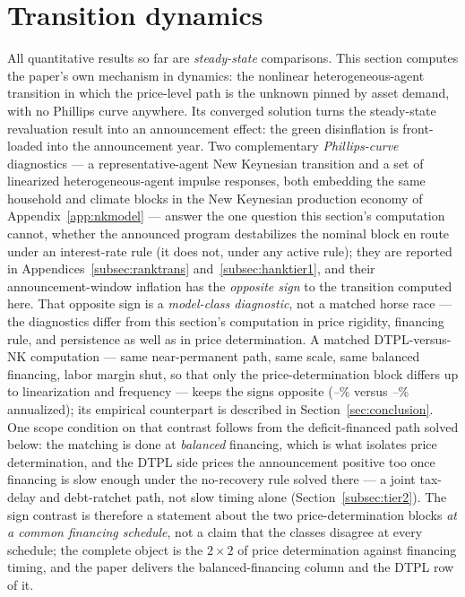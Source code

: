 \documentclass[12pt]{article}
\providecommand{\pendingnum}{\textit{--}}
\providecommand{\matchedNKimpact}{\pendingnum}
\providecommand{\matchedDTPLimpact}{\pendingnum}
\begin{document}
\section{Transition dynamics}\label{sec:transitions}

All quantitative results so far are \emph{steady-state} comparisons. This
section computes the paper's own mechanism in dynamics: the nonlinear
heterogeneous-agent transition in which the price-level path is the
unknown pinned by asset demand, with no Phillips curve anywhere. Its
converged solution turns the steady-state revaluation result into an
announcement effect: the green disinflation is front-loaded into the
announcement year. Two complementary \emph{Phillips-curve} diagnostics ---
a representative-agent New Keynesian transition and a set of linearized
heterogeneous-agent impulse responses, both embedding the same household
and climate blocks in the New Keynesian production economy of
Appendix~\ref{app:nkmodel} --- answer the one question this section's
computation cannot, whether the announced program destabilizes the nominal
block en route under an interest-rate rule (it does not, under any active
rule); they are reported in Appendices~\ref{subsec:ranktrans}
and~\ref{subsec:hanktier1}, and their announcement-window inflation has the
\emph{opposite sign} to the transition computed here. That opposite sign is
a \emph{model-class diagnostic}, not a matched horse race --- the
diagnostics differ from this section's computation in price rigidity,
financing rule, and persistence as well as in price determination. A
matched DTPL-versus-NK computation --- same near-permanent path, same
scale, same balanced financing, labor margin shut, so that only the
price-determination block differs up to linearization and frequency ---
keeps the signs opposite (\matchedNKimpact\% versus \matchedDTPLimpact\%
annualized); its empirical counterpart is described in
Section~\ref{sec:conclusion}. One scope condition on that contrast follows
from the deficit-financed path solved below: the matching is done at
\emph{balanced} financing, which is what isolates price determination,
and the DTPL side prices the announcement positive too once financing is
slow enough under the no-recovery rule solved there --- a joint tax-delay
and debt-ratchet path, not slow timing alone
(Section~\ref{subsec:tier2}). The sign contrast is therefore a
statement about the two price-determination blocks \emph{at a common
financing schedule}, not a claim that the classes disagree at every
schedule; the complete object is the $2\times2$ of price determination
against financing timing, and the paper delivers the balanced-financing
column and the DTPL row of it.
\end{document}
